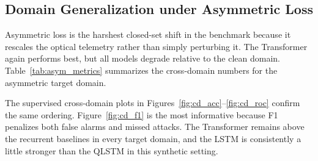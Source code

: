 \subsection{Domain Generalization under Asymmetric Loss}
Asymmetric loss is the harshest closed-set shift in the benchmark because it rescales the optical telemetry rather than simply perturbing it. The Transformer again performs best, but all models degrade relative to the clean domain. Table~\ref{tab:asym_metrics} summarizes the cross-domain numbers for the asymmetric target domain.
\begin{table}[!htbp]
\centering
\caption{Cross-Domain Generalization Metrics (ASYM Domain)}
\label{tab:asym_metrics}
\small
{}
\end{table}
The supervised cross-domain plots in Figures~\ref{fig:cd_acc}--\ref{fig:cd_roc} confirm the same ordering. Figure~\ref{fig:cd_f1} is the most informative because F1 penalizes both false alarms and missed attacks. The Transformer remains above the recurrent baselines in every target domain, and the LSTM is consistently a little stronger than the QLSTM in this synthetic setting.
